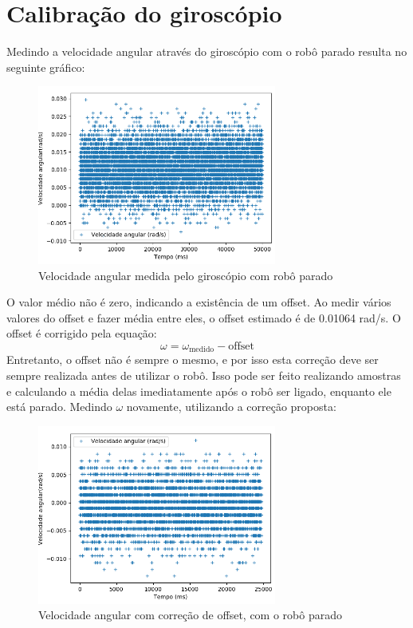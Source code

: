 \documentclass[
	12pt,				%
	openright,			%
	twoside,			%
	convert,
	a4paper,			%
	english,			%
	french,				%
	spanish,			%
	brazil				%
	]{abntex2}
\begin{document}
\section{Calibração do giroscópio}
Medindo a velocidade angular através do giroscópio com o robô parado resulta no seguinte gráfico:
\begin{figure}[H]
	\caption{Velocidade angular medida pelo giroscópio com robô parado}
	\begin{center}
   		\includegraphics[width=0.7\textwidth]{gyro_parado}
	\end{center}
\end{figure}
O valor médio não é zero, indicando a existência de um offset. Ao medir vários valores do offset e fazer média entre eles, o offset estimado é de 0.01064 rad/s. O offset é corrigido pela equação:
\begin{equation}
	\omega = \omega_{\mathrm{medido}} - \mathrm{offset}
\end{equation}
Entretanto, o offset não é sempre o mesmo, e por isso esta correção deve ser sempre realizada antes de utilizar o robô. Isso pode ser feito realizando amostras e calculando a média delas imediatamente após o robô ser ligado, enquanto ele está parado. Medindo $\omega $ novamente, utilizando a correção proposta:
\begin{figure}[H]
	\caption{Velocidade angular com correção de offset, com o robô parado}
\begin{center}
   \includegraphics[width=0.7\textwidth]{gyro_parado_auto_fix}
\end{center}
\end{figure}
\end{document}
